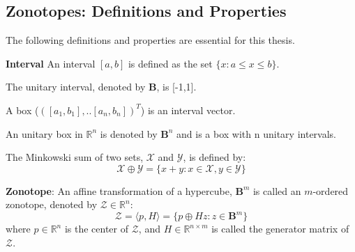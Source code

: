 \subsection{Zonotopes: Definitions and Properties}
The following definitions and properties are essential for this thesis.
\begin{definition}\textbf{Interval} An interval $[a,b]$ is defined as the set $\{x : a \leq x \leq b\}$.
\begin{subdefinition}
The unitary interval, denoted by $\textbf{B}$, is [-1,1].
\end{subdefinition}
\begin{subdefinition}
A box ($( [a_1, b_1],..[a_n, b_n] )^T$) is an interval vector.
\end{subdefinition}
\begin{subdefinition}
An unitary box in $\mathbb{R}^n$ is denoted by $\textbf{B}^n$ and is a box with n unitary intervals.
\end{subdefinition}
\end{definition}
\begin{definition}
The Minkowski sum of two sets, $\mathcal{X}$ and $\mathcal{Y}$, is defined by: 
\begin{equation}
\mathcal{X} \oplus \mathcal{Y} = \{x+ y: x \in \mathcal{X}, y \in \mathcal{Y}\}
\end{equation}
\end{definition}
\begin{definition}
\textbf{Zonotope}:
An affine transformation of a hypercube, $\textbf{B}^m$ is called an $m$-ordered zonotope, denoted by $\mathcal{Z}\in \mathbb{R}^n$:\\
\begin{equation}
\mathcal{Z} = \langle p, H \rangle = \{p \oplus Hz: z \in \textbf{B}^m\}
\end{equation}
where $p \in \mathbb{R}^n$ is the center of $\mathcal{Z}$, and $H \in \mathbb{R}^{n \times m}$ is called the generator matrix of $\mathcal{Z}$.
\end{definition}

